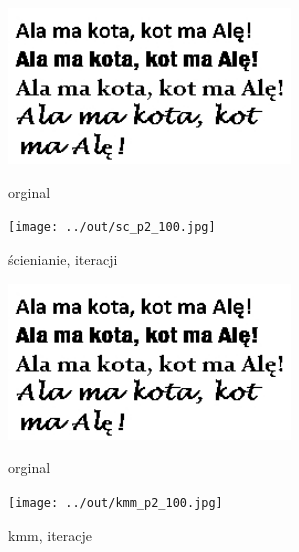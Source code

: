 \documentclass[a4paper,12pt]{article}
\begin{document}
\begin{figure}[h!]
\begin{minipage}[t]{7.5cm}
\begin{center}
\includegraphics[width=7.5cm]{../in/p2.jpg}
\caption{orginal}
\end{center}
\end{minipage}
\hfill
\begin{minipage}[t]{7.5cm}
\begin{center}
\texttt{[image: ../out/sc\_p2\_100.jpg]}
\caption{ścienianie, \protect iteracji}
\end{center}
\end{minipage}
\end{figure}

\begin{figure}[h!]
\begin{minipage}[t]{7.5cm}
\begin{center}
\includegraphics[width=7.5cm]{../in/p2.jpg}
\caption{orginal}
\end{center}
\end{minipage}
\hfill
\begin{minipage}[t]{7.5cm}
\begin{center}
\texttt{[image: ../out/kmm\_p2\_100.jpg]}
\caption{kmm, \protect iteracje}
\end{center}
\end{minipage}
\end{figure}
\end{document}
